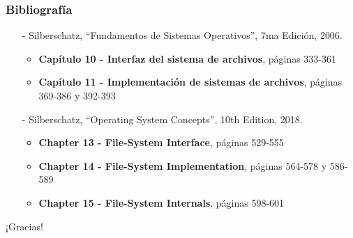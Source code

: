 \documentclass[aspectratio=169]{beamer}
\begin{document}
\begin{frame}[fragile]
    \frametitle{Bibliografía}
    \begin{itemize}
        \setlength\itemsep{0.5cm}
        \item[-] \small Silberschatz, ``Fundamentos de Sistemas Operativos'', 7ma Edición, 2006.\\
        \begin{itemize}
            \item \textbf{Capítulo 10 - Interfaz del sistema de archivos}, páginas 333-361
            \item \textbf{Capítulo 11 - Implementación de sistemas de archivos}, páginas 369-386 y 392-393
        \end{itemize}
        \item[-] \small Silberschatz, ``Operating System Concepts'', 10th Edition, 2018.\\
        \begin{itemize}
            \item \textbf{Chapter 13 - File-System Interface}, páginas 529-555
            \item \textbf{Chapter 14 - File-System Implementation}, páginas 564-578 y 586-589
            \item \textbf{Chapter 15 - File-System Internals}, páginas 598-601
        \end{itemize}
    \end{itemize}
\end{frame}

\begin{frame}[plain]
    \begin{center}
    \vspace{2cm}
    \huge ¡Gracias!\\
    \vspace{2cm}
    \end{center}
\end{frame}
\end{document}
